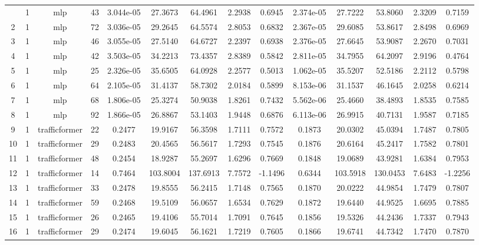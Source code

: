 \begin{landscape}
\begin{longtable}{c c c c c c c c c c c c c c}
	\bottomrule
	\endlastfoot
	1 & 1 & mlp & 43 & 3.044e-05 & 27.3673 & 64.4961 & 2.2938 & 0.6945 & 2.374e-05 & 27.7222 & 53.8060 & 2.3209 & 0.7159 \\
	2 & 1 & mlp & 72 & 3.036e-05 & 29.2645 & 64.5574 & 2.8053 & 0.6832 & 2.367e-05 & 29.6085 & 53.8617 & 2.8498 & 0.6969 \\
	3 & 1 & mlp & 46 & 3.055e-05 & 27.5140 & 64.6727 & 2.2397 & 0.6938 & 2.376e-05 & 27.6645 & 53.9087 & 2.2670 & 0.7031 \\
	4 & 1 & mlp & 42 & 3.503e-05 & 34.2213 & 73.4357 & 2.8389 & 0.5842 & 2.811e-05 & 34.7955 & 64.2097 & 2.9196 & 0.4764 \\
	5 & 1 & mlp & 25 & 2.326e-05 & 35.6505 & 64.0928 & 2.2577 & 0.5013 & 1.062e-05 & 35.5207 & 52.5186 & 2.2112 & 0.5798 \\
	6 & 1 & mlp & 64 & 2.105e-05 & 31.4137 & 58.7302 & 2.0184 & 0.5899 & 8.153e-06 & 31.1537 & 46.1645 & 2.0258 & 0.6214 \\
	7 & 1 & mlp & 68 & 1.806e-05 & 25.3274 & 50.9038 & 1.8261 & 0.7432 & 5.562e-06 & 25.4660 & 38.4893 & 1.8535 & 0.7585 \\
	8 & 1 & mlp & 92 & 1.866e-05 & 26.8867 & 53.1403 & 1.9448 & 0.6876 & 6.113e-06 & 26.9915 & 40.7131 & 1.9587 & 0.7185 \\
	9 & 1 & trafficformer & 22 & 0.2477 & 19.9167 & 56.3598 & 1.7111 & 0.7572 & 0.1873 & 20.0302 & 45.0394 & 1.7487 & 0.7805 \\
	10 & 1 & trafficformer & 29 & 0.2483 & 20.4565 & 56.5617 & 1.7293 & 0.7545 & 0.1876 & 20.6164 & 45.2417 & 1.7582 & 0.7801 \\
	11 & 1 & trafficformer & 48 & 0.2454 & 18.9287 & 55.2697 & 1.6296 & 0.7669 & 0.1848 & 19.0689 & 43.9281 & 1.6384 & 0.7953 \\
	12 & 1 & trafficformer & 14 & 0.7464 & 103.8004 & 137.6913 & 7.7572 & -1.1496 & 0.6344 & 103.5918 & 130.0453 & 7.6483 & -1.2256 \\
	13 & 1 & trafficformer & 33 & 0.2478 & 19.8555 & 56.2415 & 1.7148 & 0.7565 & 0.1870 & 20.0222 & 44.9854 & 1.7479 & 0.7807 \\
	14 & 1 & trafficformer & 59 & 0.2468 & 19.5109 & 56.0657 & 1.6534 & 0.7629 & 0.1872 & 19.6440 & 44.9525 & 1.6695 & 0.7885 \\
	15 & 1 & trafficformer & 26 & 0.2465 & 19.4106 & 55.7014 & 1.7091 & 0.7645 & 0.1856 & 19.5326 & 44.2436 & 1.7337 & 0.7943 \\
	16 & 1 & trafficformer & 29 & 0.2474 & 19.6045 & 56.1621 & 1.7219 & 0.7605 & 0.1866 & 19.6741 & 44.7342 & 1.7470 & 0.7870 \\

\end{longtable}
\end{landscape}
